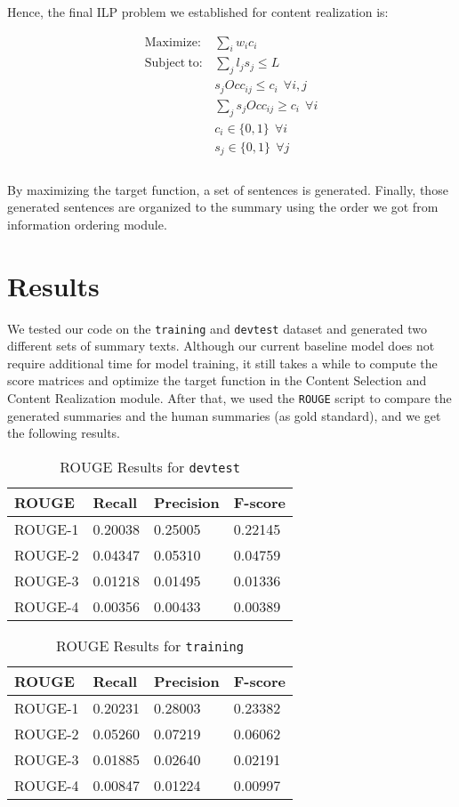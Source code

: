 \documentclass[11pt]{article}
\begin{document}
Hence, the final ILP problem we established for content realization is:

\begin{equation}
	\begin{aligned}
	\mathrm{Maximize:} & \sum_i{w_ic_i} \\
	\mathrm{Subject\ to:} & \sum_j{l_js_j} \leq L \\
 	& s_jOcc_{ij} \leq c_i\ \ \forall i,j\\
	& \sum_j s_jOcc_{ij} \geq c_i\ \ \forall i \\
	& c_i \in \{0,1\}\ \ \forall i \\
	& s_j \in \{0,1\}\ \ \forall j \\
	\end{aligned}
\end{equation}
\\
\indent
By maximizing the target function, a set of sentences is generated. Finally, those generated sentences are organized to the summary using the order we got from information ordering module.

\section{Results}

We tested our code on the \texttt{training} and \texttt{devtest} dataset and generated two different sets of summary texts. Although our current baseline model does not require additional time for model training, it still takes a while to compute the score matrices and optimize the target function in the Content Selection and Content Realization module. After that, we used the \texttt{ROUGE} script to compare the generated summaries and the human summaries (as gold standard), and we get the following results.
\begin{table}[h!]
\centering
\caption{ROUGE Results for \texttt{devtest}}
\begin{tabular}{|l|l|l|l|}
\hline
ROUGE   & Recall  & Precision & F-score \\ \hline
ROUGE-1 & 0.20038 & 0.25005   & 0.22145 \\ \hline
ROUGE-2 & 0.04347 & 0.05310   & 0.04759 \\ \hline
ROUGE-3 & 0.01218 & 0.01495   & 0.01336 \\ \hline
ROUGE-4 & 0.00356 & 0.00433   & 0.00389 \\ \hline
\end{tabular}
\end{table}
\begin{table}[h!]
\centering
\caption{ROUGE Results for \texttt{training}}
\begin{tabular}{|l|l|l|l|}
\hline
ROUGE   & Recall  & Precision & F-score \\ \hline
ROUGE-1 & 0.20231 & 0.28003   & 0.23382 \\ \hline
ROUGE-2 & 0.05260 & 0.07219   & 0.06062 \\ \hline
ROUGE-3 & 0.01885 & 0.02640   & 0.02191 \\ \hline
ROUGE-4 & 0.00847 & 0.01224   & 0.00997 \\ \hline
\end{tabular}
\end{table}
\end{document}
